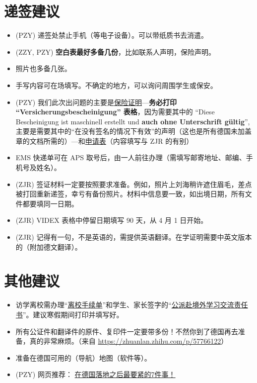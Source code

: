 \documentclass{ctexart}
\begin{document}
\section{递签建议}
\begin{itemize}
\item (PZY) 递签处禁止手机（等电子设备）。可以带纸质书去消遣。
\item (ZZY, PZY) \textbf{\color{blue}空白表最好多备几份}，比如联系人声明，保险声明。
\item\label{print-fee} 照片也多备几张。
\item 手写内容可在场填写。不确定的地方，可以询问周围学生或保安。
\item\label{ensurance-Versicherungsbescheinigung} (PZY) 我们此次出问题的主要是\underline{保险证明}---\textbf{\color{red}务必打印 ``Versicherungsbescheinigung'' 表格}，因为需要其中的 ``Diese Bescheinigung ist maschinell erstellt und \textbf{\color{red}auch ohne Unterschrift gültig}'', 主要是需要其中的“在没有签名的情况下有效”的声明（这也是所有德国未加盖章的文档所需的）---和\underline{申请表}（内容填写与 ZJR 的有别）%
\item EMS 快递单可在 APS 取号后，由一人前往办理（需填写邮寄地址、邮编、手机号及姓名）。
\item (ZJR) 签证材料一定要按照要求准备。例如，照片上刘海稍许遮住眉毛，差点被打回重新递签，幸亏有备份照片。材料中信息要一致，如出境日期，所有文件都要填同一日期。
\item (ZJR) VIDEX 表格中停留日期填写 90 天，从 4 月 1 日开始。
\item (ZJR) 记得有一句，不是英语的，需提供英语翻译。在学证明需要中英文版本的（附加德文翻译）。
\end{itemize}
%

\section{其他建议}
\begin{itemize}
  \item 访学离校需办理“\href{http://bkjy.ucas.ac.cn/index.php/fxjl/download/3401-2017-06-13-03-47-14?task=down&fid=818}{离校手续单}”和学生、家长签字的“\href{http://bkjy.ucas.ac.cn/index.php/fxjl/download/3400-2017-06-13-03-46-26?task=down&fid=701}{公派赴境外学习交流责任书}”。建议寒假期间打印并填写好。
  \item 所有公证件和翻译件的原件、复印件一定要带多份！不然你到了德国再去准备，真的非常麻烦。（来自 \url{https://zhuanlan.zhihu.com/p/57766122}）
  \item 准备在德国可用的（导航）地图（软件等）。
  \item (PZY) 网页推荐： \href{https://mp.weixin.qq.com/s?srcid=0319fCMV7x6jt2w4xgPGYSMm&scene=23&mid=2651269086&sn=2b9eff5e72b2e989ac404be9be21bc09&idx=2&__biz=MzA4NTM2MzAxNw%3D%3D&chksm=842a97f8b35d1eee47778e42c10d883071d1546d6bab41132685fd4c983a6d713ca70a9b2328&mpshare=1#rd&appinstall=0}{在德国落地之后最要紧的7件事！}
\end{itemize}
\end{document}
